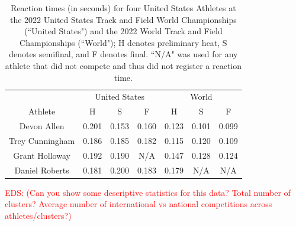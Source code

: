 \documentclass[12pt, letterpaper, titlepage]{article}
\newcommand{\eds}[1]{\textcolor{red}{EDS: (#1)}}
\begin{document}
\begin{table}
\begin{center}
  \caption{Reaction times (in seconds) for four United States Athletes at the 
	2022 United States Track
  and Field World Championships (``United States") and the 2022 World Track and Field 
	Championships (``World"); H denotes preliminary heat, S denotes semifinal, and 
	F denotes final.
  ``N/A" was used for any athlete that did not compete and thus did not register 
  a reaction time. }
  \begin{tabular}{c c c c c c c} 
   \toprule
	 & \multicolumn{3}{c}{United States} & \multicolumn{3}{c}{World} \\
	\cmidrule(lr){2-4}
    \cmidrule(lr){5-7}
   Athlete &  H &  S &  F &  H &  S &  F \\ [0.5ex] 
   \midrule
   Devon Allen & 0.201 & 0.153 & 0.160 & 0.123 & 0.101 & 0.099 \\ 
   Trey Cunningham & 0.186 & 0.185 & 0.182 & 0.115 & 0.120 & 0.109 \\
   Grant Holloway & 0.192 & 0.190 & N/A & 0.147 & 0.128 & 0.124 \\
   Daniel Roberts & 0.181 & 0.200 & 0.183 & 0.179 & N/A & N/A \\ [0.5ex]
   \bottomrule
  \end{tabular}
  \label{fig:USAvsWorld}
  
  \end{center}
\end{table}


\eds{Can you show some descriptive statistics for this data?  Total number of 
clusters? Average number of international vs national competitions across 
athletes/clusters?}
\end{document}
